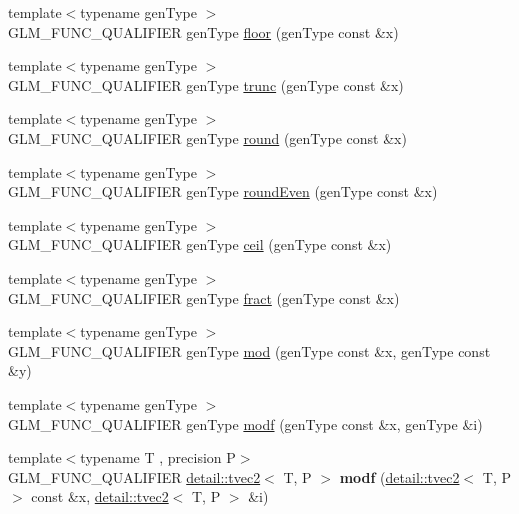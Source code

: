 \begin{DoxyCompactItemize}
\item 
{\footnotesize template$<$typename gen\+Type $>$ }\\G\+L\+M\+\_\+\+F\+U\+N\+C\+\_\+\+Q\+U\+A\+L\+I\+F\+I\+ER gen\+Type \hyperlink{group__core__func__common_ga86350252cc9bf86421317460bbd1f21c}{floor} (gen\+Type const \&x)
\item 
{\footnotesize template$<$typename gen\+Type $>$ }\\G\+L\+M\+\_\+\+F\+U\+N\+C\+\_\+\+Q\+U\+A\+L\+I\+F\+I\+ER gen\+Type \hyperlink{group__core__func__common_gadb091aed51e45872f6dc841affa41c5c}{trunc} (gen\+Type const \&x)
\item 
{\footnotesize template$<$typename gen\+Type $>$ }\\G\+L\+M\+\_\+\+F\+U\+N\+C\+\_\+\+Q\+U\+A\+L\+I\+F\+I\+ER gen\+Type \hyperlink{group__core__func__common_ga75ebab3fe88a9c5c769135cf5a2649ef}{round} (gen\+Type const \&x)
\item 
{\footnotesize template$<$typename gen\+Type $>$ }\\G\+L\+M\+\_\+\+F\+U\+N\+C\+\_\+\+Q\+U\+A\+L\+I\+F\+I\+ER gen\+Type \hyperlink{group__core__func__common_ga6535952553479a4bbca7f1f12a011b17}{round\+Even} (gen\+Type const \&x)
\item 
{\footnotesize template$<$typename gen\+Type $>$ }\\G\+L\+M\+\_\+\+F\+U\+N\+C\+\_\+\+Q\+U\+A\+L\+I\+F\+I\+ER gen\+Type \hyperlink{group__core__func__common_gab81e02fff55c9391e28fa47e68c3c903}{ceil} (gen\+Type const \&x)
\item 
{\footnotesize template$<$typename gen\+Type $>$ }\\G\+L\+M\+\_\+\+F\+U\+N\+C\+\_\+\+Q\+U\+A\+L\+I\+F\+I\+ER gen\+Type \hyperlink{group__core__func__common_gad04ac2908d032d5518d5f6c8403dbc8b}{fract} (gen\+Type const \&x)
\item 
{\footnotesize template$<$typename gen\+Type $>$ }\\G\+L\+M\+\_\+\+F\+U\+N\+C\+\_\+\+Q\+U\+A\+L\+I\+F\+I\+ER gen\+Type \hyperlink{group__core__func__common_ga8cc8a75b05125fe1c30de43102ef42e1}{mod} (gen\+Type const \&x, gen\+Type const \&y)
\item 
{\footnotesize template$<$typename gen\+Type $>$ }\\G\+L\+M\+\_\+\+F\+U\+N\+C\+\_\+\+Q\+U\+A\+L\+I\+F\+I\+ER gen\+Type \hyperlink{group__core__func__common_gae47da02eb07d660201c09a0df7298a05}{modf} (gen\+Type const \&x, gen\+Type \&i)
\item 
{\footnotesize template$<$typename T , precision P$>$ }\\G\+L\+M\+\_\+\+F\+U\+N\+C\+\_\+\+Q\+U\+A\+L\+I\+F\+I\+ER \hyperlink{structglm_1_1detail_1_1tvec2}{detail\+::tvec2}$<$ T, P $>$ {\bfseries modf} (\hyperlink{structglm_1_1detail_1_1tvec2}{detail\+::tvec2}$<$ T, P $>$ const \&x, \hyperlink{structglm_1_1detail_1_1tvec2}{detail\+::tvec2}$<$ T, P $>$ \&i)\hypertarget{namespaceglm_a853da29134180c976324f3db6ae57efd}{}\label{namespaceglm_a853da29134180c976324f3db6ae57efd}


\end{DoxyCompactItemize}
